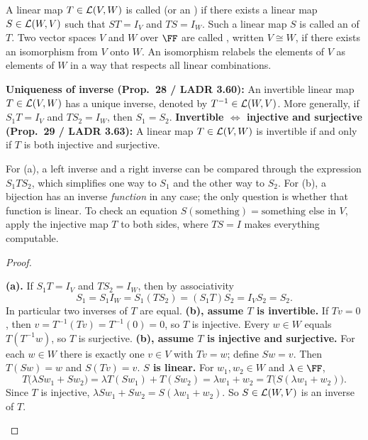 \documentclass[10pt]{scrartcl}
\begin{document}
\begin{definition*}
  \begin{itemize}
    \ii A linear map $T\in\mathcal L(V,W)$ is called  (or an ) if there exists a linear map $S\in\mathcal L(W,V)$ such that $ST=I_V$ and $TS=I_W$. Such a linear map $S$ is called an  of $T$.
    \ii Two vector spaces $V$ and $W$ over $\FF$ are called , written $V\cong W$, if there exists an isomorphism from $V$ onto $W$. An isomorphism relabels the elements of $V$ as elements of $W$ in a way that respects all linear combinations.
  \end{itemize}
\end{definition*}

\begin{proposition*}
  \begin{enumerate}[(a)]
    \ii \textbf{Uniqueness of inverse (Prop.~28 / LADR 3.60):} An invertible linear map $T\in\mathcal L(V,W)$ has a unique inverse, denoted by $T^{-1}\in\mathcal L(W,V)$. More generally, if $S_1T=I_V$ and $TS_2=I_W$, then $S_1=S_2$.
    \ii \textbf{Invertible $\iff$ injective and surjective (Prop.~29 / LADR 3.63):} A linear map $T\in\mathcal L(V,W)$ is invertible if and only if $T$ is both injective and surjective.
  \end{enumerate}
\end{proposition*}
\begin{ideabox}
  For (a), a left inverse and a right inverse can be compared through the expression $S_1TS_2$, which simplifies one way to $S_1$ and the other way to $S_2$. For (b), a bijection has an inverse \emph{function} in any case; the only question is whether that function is linear. To check an equation $S(\text{something})=\text{something else}$ in $V$, apply the injective map $T$ to both sides, where $TS=I$ makes everything computable.
\end{ideabox}
\begin{proof}
  \begin{steps}
    \ii \textbf{(a).} If $S_1T=I_V$ and $TS_2=I_W$, then by associativity
    \[
      S_1=S_1I_W=S_1(TS_2)=(S_1T)S_2=I_VS_2=S_2 .
    \]
    In particular two inverses of $T$ are equal.
    \ii \textbf{(b), assume $T$ is invertible.} If $Tv=0$, then $v=T^{-1}(Tv)=T^{-1}(0)=0$, so $T$ is injective. Every $w\in W$ equals $T(T^{-1}w)$, so $T$ is surjective.
    \ii \textbf{(b), assume $T$ is injective and surjective.} For each $w\in W$ there is exactly one $v\in V$ with $Tv=w$; define $Sw=v$. Then $T(Sw)=w$ and $S(Tv)=v$.
    \ii \textbf{$S$ is linear.} For $w_1,w_2\in W$ and $\lambda\in\FF$,
    \[
      T\big(\lambda Sw_1 + Sw_2\big) = \lambda T(Sw_1) + T(Sw_2) = \lambda w_1 + w_2 = T\big(S(\lambda w_1+w_2)\big).
    \]
    Since $T$ is injective, $\lambda Sw_1+Sw_2=S(\lambda w_1+w_2)$. So $S\in\mathcal L(W,V)$ is an inverse of $T$.
  \end{steps}
\end{proof}
\end{document}
